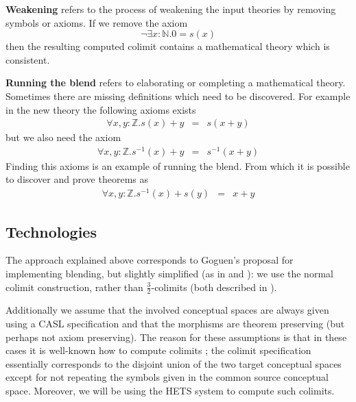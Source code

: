 {\bf Weakening} refers to the process of weakening the input
theories by removing symbols or axioms. If we remove the axiom 
$$
\neg \exists x: \mathbb{N}. 0 = s(x)
$$
then the resulting computed colimit contains a mathematical theory
which is consistent.

{\bf Running the blend} refers to elaborating or completing a
mathematical theory. Sometimes there are missing definitions which
need to be discovered. For example in the new theory the following
axioms exists
\begin{eqnarray*}
\forall x,y:\mathbb{Z}. s(x) + y &=& s(x+y)
\end{eqnarray*}
but we also need the axiom
\begin{eqnarray*}
\forall x,y:\mathbb{Z}. s^{-1}(x) + y &=& s^{-1}(x+y)
\end{eqnarray*}
Finding this axioms is an example of running the blend. From which it
is possible to discover and prove 
theorems as
\begin{eqnarray*}
\forall x,y:\mathbb{Z}. s^{-1}(x) + s(y) &=& x+y
\end{eqnarray*}

\subsection{Technologies}


The approach explained above corresponds to Goguen's
proposal \parencite{Gog99} for implementing blending, but slightly
simplified (as in \textcite{Kutz2012} and \textcite{KuMoNeCo14}): we use
the normal colimit construction, rather than $\frac{3}{2}$-colimits
(both described in \textcite{Gog99}).


Additionally we assume that the involved conceptual spaces are always
given using a CASL specification \parencite{MoHaSaTa08} and that the
morphisms are theorem preserving (but perhaps not axiom
preserving). The reason for these assumptions is that in these cases
it is well-known how to compute colimits \parencite{Mo98a}; the colimit
specification essentially corresponds to the disjoint union of the two
target conceptual spaces except for not repeating the symbols given in
the common source conceptual space.  Moreover, we will be using the
HETS system \parencite{MossakowskiEA06} to compute such colimits.


